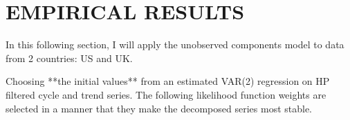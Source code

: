\documentclass[
  12pt,
]{article}
\begin{document}
\begin{table}[H]
\begin{threeparttable}
\begin{tabular}{@{}ll@{}}
                    \bottomrule
                \end{tabular}
            \end{threeparttable}
        \end{table}

\hypertarget{empirical-results}{%
\section{EMPIRICAL RESULTS}\label{empirical-results}}

        In this following section, I will apply the unobserved components model to data from 2 countries: US and UK.
        
Choosing **the initial values** from an estimated VAR(2) regression on HP filtered cycle and trend series. The following likelihood function weights are selected in a manner that they make the decomposed series most stable. 
        
\end{document}
